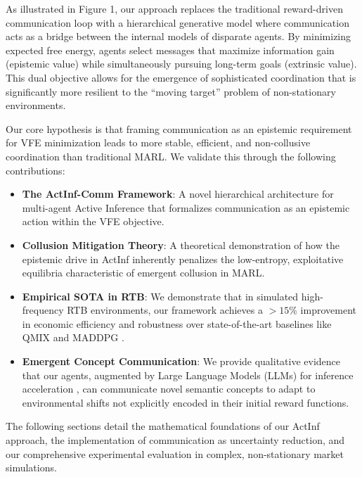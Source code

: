 As illustrated in Figure 1, our approach replaces the traditional reward-driven communication loop with a hierarchical generative model where communication acts as a bridge between the internal models of disparate agents. By minimizing expected free energy, agents select messages that maximize information gain (epistemic value) while simultaneously pursuing long-term goals (extrinsic value). This dual objective allows for the emergence of sophisticated coordination that is significantly more resilient to the ``moving target'' problem of non-stationary environments.

Our core hypothesis is that framing communication as an epistemic requirement for VFE minimization leads to more stable, efficient, and non-collusive coordination than traditional MARL. We validate this through the following contributions:
\begin{itemize}
    \item \textbf{The ActInf-Comm Framework}: A novel hierarchical architecture for multi-agent Active Inference that formalizes communication as an epistemic action within the VFE objective.
    \item \textbf{Collusion Mitigation Theory}: A theoretical demonstration of how the epistemic drive in ActInf inherently penalizes the low-entropy, exploitative equilibria characteristic of emergent collusion in MARL.
    \item \textbf{Empirical SOTA in RTB}: We demonstrate that in simulated high-frequency RTB environments, our framework achieves a $>15\%$ improvement in economic efficiency and robustness over state-of-the-art baselines like QMIX \cite{rashid2018qmix} and MADDPG \cite{lowe2017multi}.
    \item \textbf{Emergent Concept Communication}: We provide qualitative evidence that our agents, augmented by Large Language Models (LLMs) for inference acceleration \cite{wei2022chain}, can communicate novel semantic concepts to adapt to environmental shifts not explicitly encoded in their initial reward functions.
\end{itemize}

The following sections detail the mathematical foundations of our ActInf approach, the implementation of communication as uncertainty reduction, and our comprehensive experimental evaluation in complex, non-stationary market simulations.